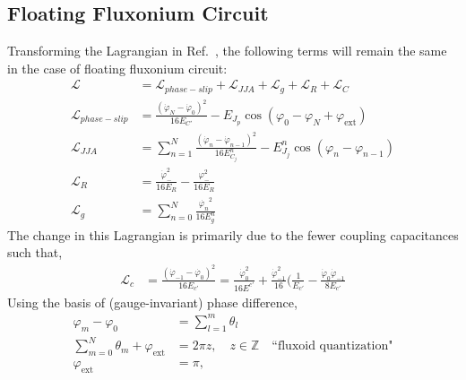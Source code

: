 \documentclass[%
reprint,
superscriptaddress,
 amsmath,amssymb,
 aps,
 prx,
longbibliography,
floatfix,
]{revtex4-2}
\begin{document}
\subsection{Floating Fluxonium Circuit}
Transforming the Lagrangian in Ref.~\cite{viola2015collective}, the following terms will remain the same in the case of floating fluxonium circuit:
\begin{align}
    \mathcal{L}&=\mathcal{L}_{phase-slip}+\mathcal{L}_{JJA}+\mathcal{L}_{g}+\mathcal{L}_{R}+\mathcal{L}_{C}\\
    \mathcal{L}_{phase-slip}&=\frac{(\dot{\varphi}_N-\dot{\varphi}_0)^2}{16E_{C'}}-E_{J_p}\cos(\varphi_0-\varphi_{N}+\varphi_\mathrm{ext})\\
    \mathcal{L}_{JJA}&=\sum_{n=1}^N\frac{(\dot{\varphi}_n-\dot{\varphi}_{n-1})^2}{16E^{n}_{C_j}}-E^{n}_{J_j}\cos(\varphi_n-\varphi_{n-1})\\
    \mathcal{L}_{R}&=\frac{\dot{\varphi}_{-}^2}{16E_{{R}}}-\frac{\varphi_{-}^2}{16E_{R}}\\
    \mathcal{L}_{g}&=\sum_{n=0}^N \frac{\dot{\varphi_n}^2}{16E^n_{g}}\label{eq:float-float}
  \end{align}
The change in this Lagrangian is primarily due to the fewer coupling capacitances such that,
\begin{align}
\mathcal{L}_{c}&=\frac{(\dot{\varphi}_{-1}-\dot{\varphi_0})^2}{16E_{c'}}=\frac{\dot{\varphi}^2_0}{16E^{c'}}+\frac{\dot{\varphi}^2_{-1}}{16}\Big(\frac{1}{E_{c'}}-\frac{\dot{\varphi}_0\dot{\varphi}_{-1}}{8E_{c'}}
\end{align}
Using the basis of (gauge-invariant) phase difference, 
\begin{align}
\varphi_m-\varphi_0&=\sum_{l=1}^m\theta_l\\ \sum_{m=0}^N \theta_m+\varphi_\mathrm{ext}&=2\pi z, \quad z\in\mathbb{Z}\quad\text{``fluxoid quantization"}\\
\varphi_\mathrm{ext}&=\pi,    
\end{align}
\end{document}
